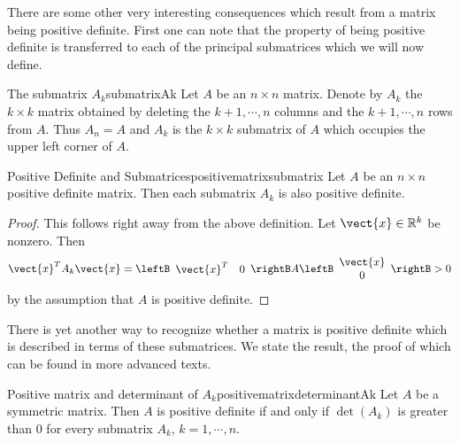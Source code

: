 There are some other very interesting consequences which result from a
matrix being positive definite. First one can note that the property of
being positive definite is transferred to each of the principal submatrices which we will now define.

\begin{definition}{The submatrix $A_k$}{submatrixAk}
Let $A$ be an $n\times n$ matrix. Denote by $A_{k}$ the $k\times k$ matrix
obtained by deleting the $k+1,\cdots ,n$ columns and the $k+1,\cdots ,n$
rows from $A.$ Thus $A_{n}=A$ and $A_{k}$ is the $k\times k$ submatrix of $A$
which occupies the upper left corner of $A.$
\end{definition}

\begin{lemma}{Positive Definite and Submatrices}{positivematrixsubmatrix}
Let $A$ be an $n\times n$ positive definite matrix.  Then each submatrix $A_{k}$ is also positive definite.
\end{lemma}

\begin{proof}
This follows right away from the above definition. Let $\vect{x}\in \mathbb{R}^{k}$ be nonzero. Then 
\begin{equation*}
\vect{x}^{T}A_{k}\vect{x}=\leftB 
\begin{array}{cc}
\vect{x}^{T} & 0
\end{array}
\rightB A\leftB 
\begin{array}{c}
\vect{x} \\ 
0
\end{array}
\rightB >  0
\end{equation*}
by the assumption that $A$ is positive definite.
\end{proof}

There is yet another way to recognize whether a matrix is positive definite
which is described in terms of these submatrices. We state the result,  the proof
of which can be found in more advanced texts.

\begin{theorem}{Positive matrix and determinant of $A_k$}{positivematrixdeterminantAk}   
Let $A$ be a symmetric matrix. Then $A$ is positive definite if
and only if $\det \left( A_{k}\right)$ is greater than $0$ for every submatrix $A_{k}$,  $k=1,\cdots ,n$. 
\end{theorem}


